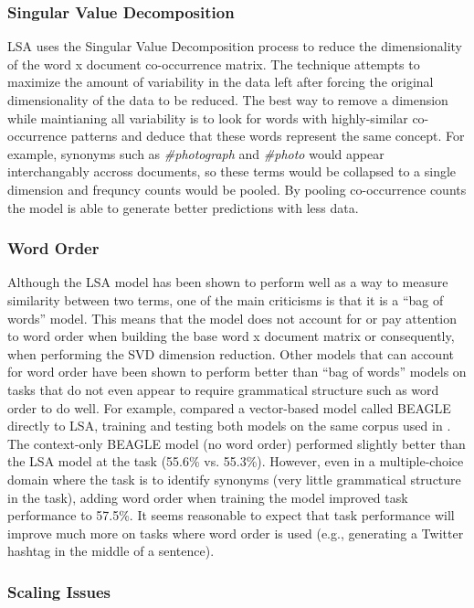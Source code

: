 \documentclass[man,floatsintext]{apa6}
\begin{document}
\subsubsection{Singular Value Decomposition}

LSA uses the Singular Value Decomposition process to reduce the dimensionality of the word x document co-occurrence matrix.
The technique attempts to maximize the amount of variability in the data left after forcing the original dimensionality of the data to be reduced.
The best way to remove a dimension while maintianing all variability is to look for words with highly-similar co-occurrence patterns and deduce that these words represent the same concept.
For example, synonyms such as \emph{\#photograph} and \emph{\#photo} would appear interchangably accross documents, so these terms would be collapsed to a single dimension and frequncy counts would be pooled.
By pooling co-occurrence counts the model is able to generate better predictions with less data.

\subsubsection{Word Order}

Although the LSA model has been shown to perform well as a way to measure similarity between two terms, one of the main criticisms is that it is a ``bag of words'' model.
This means that the model does not account for or pay attention to word order when building the base word x document matrix or consequently, when performing the SVD dimension reduction.
Other models that can account for word order have been shown to perform better than ``bag of words'' models on tasks that do not even appear to require grammatical structure such as word order to do well.
For example, \textcite{Jones2007} compared a vector-based model called BEAGLE directly to LSA, training and testing both models on the same corpus used in \textcite{Landauer1997}.
The context-only BEAGLE model (no word order) performed slightly better than the LSA model at the task (55.6\% vs. 55.3\%).
However, even in a multiple-choice domain where the task is to identify synonyms (very little grammatical structure in the task), adding word order when training the model improved task performance to 57.5\%.
It seems reasonable to expect that task performance will improve much more on tasks where word order is used (e.g., generating a Twitter hashtag in the middle of a sentence).

\subsubsection{Scaling Issues}
\end{document}
